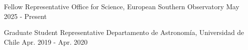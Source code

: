 

\begin{cvhonors}
    \cvhonor
	{Fellow Representative} %
	{Office for Science, European Southern Observatory} %
	{} %
	{May 2025 - Present} %

	\cvhonor
	{Graduate Student Representative} %
	{Departamento de Astronom\'ia, Universidad de Chile} %
	{} %
	{Apr. 2019 - Apr. 2020} %

	
\end{cvhonors}